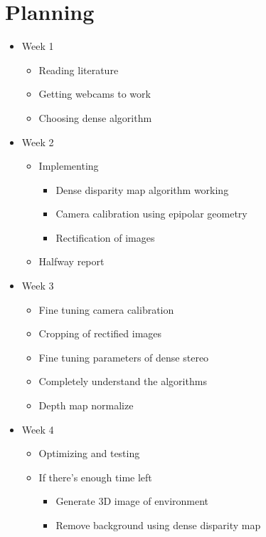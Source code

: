 \documentclass[a4paper]{article}
\begin{document}
\section{Planning}
\begin{itemize}
  \item Week 1
    \begin{itemize}
      \item Reading literature
      \item Getting webcams to work
      \item Choosing dense algorithm
    \end{itemize}
  \item Week 2
    \begin{itemize}
      \item Implementing
        \begin{itemize}
          \item Dense disparity map algorithm working
          \item Camera calibration using epipolar geometry
          \item Rectification of images
        \end{itemize}
      \item Halfway report
    \end{itemize}
    
  \item Week 3
    \begin{itemize}
    \item Fine tuning camera calibration
    \item Cropping of rectified images
    \item Fine tuning parameters of dense stereo
    \item Completely understand the algorithms
    \item Depth map normalize
    \end{itemize}


  \item Week 4
    \begin{itemize}
      \item Optimizing and testing
      \item If there's enough time left
        \begin{itemize}
          \item Generate 3D image of environment
          \item Remove background using dense disparity map
        \end{itemize}
    \end{itemize}
\end{itemize}
\end{document}
